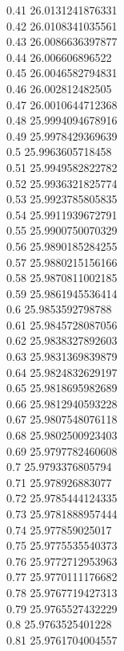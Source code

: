 {0.41	26.0131241876331\\
0.42	26.0108341035561\\
0.43	26.0086636397877\\
0.44	26.006606896522\\
0.45	26.0046582794831\\
0.46	26.002812482505\\
0.47	26.0010644712368\\
0.48	25.9994094678916\\
0.49	25.9978429369639\\
0.5	25.9963605718458\\
0.51	25.9949582822782\\
0.52	25.9936321825774\\
0.53	25.9923785805835\\
0.54	25.9911939672791\\
0.55	25.9900750070329\\
0.56	25.9890185284255\\
0.57	25.9880215156166\\
0.58	25.9870811002185\\
0.59	25.9861945536414\\
0.6	25.9853592798788\\
0.61	25.9845728087056\\
0.62	25.9838327892603\\
0.63	25.9831369839879\\
0.64	25.9824832629197\\
0.65	25.9818695982689\\
0.66	25.9812940593228\\
0.67	25.9807548076118\\
0.68	25.9802500923403\\
0.69	25.9797782460608\\
0.7	25.9793376805794\\
0.71	25.978926883077\\
0.72	25.9785444124335\\
0.73	25.9781888957444\\
0.74	25.977859025017\\
0.75	25.9775535540373\\
0.76	25.9772712953963\\
0.77	25.9770111176682\\
0.78	25.9767719427313\\
0.79	25.9765527432229\\
0.8	25.9763525401228\\
0.81	25.9761704004557\\
}
